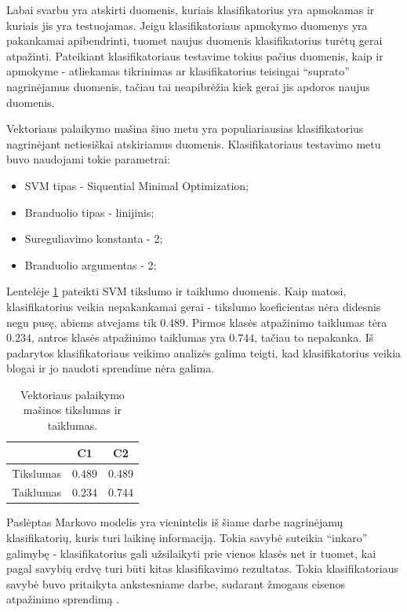 \documentclass[]{vgtuef}
\begin{document}
Labai svarbu yra atskirti duomenis, kuriais klasifikatorius yra
apmokamas ir kuriais jis yra testuojamas. Jeigu klasifikatoriaus
apmokymo duomenys yra pakankamai apibendrinti, tuomet naujus duomenis
klasifikatorius turėtų gerai atpažinti. Pateikiant klasifikatoriaus
testavime tokius pačius duomenis, kaip ir apmokyme - atliekamas
tikrinimas ar klasifikatorius teisingai ``suprato'' nagrinėjamus
duomenis, tačiau tai neapibrėžia kiek gerai jis apdoros naujus duomenis.

Vektoriaus palaikymo mašina šiuo metu yra populiariausias
klasifikatorius nagrinėjant netiesiškai atskiriamus
duomenis. Klasifikatoriaus testavimo metu buvo naudojami tokie
parametrai:

\begin{itemize}
\item SVM tipas - Siquential Minimal Optimization;
\item Branduolio tipas - linijinis;
\item Sureguliavimo konstanta - 2;
\item Branduolio argumentas - 2;
\end{itemize}

Lentelėje \ref{table:svm_scores} pateikti SVM tikslumo ir
taiklumo duomenis. Kaip matosi, klasifikatorius veikia nepakankamai
gerai - tikslumo koeficientas nėra didesnis negu pusę, abiems atvejams
tik $0.489$. Pirmos klasės atpažinimo taiklumas tėra $0.234$, antros
klasės atpažinimo taiklumas yra $0.744$, tačiau to nepakanka. Iš
padarytos klasifikatoriaus veikimo analizės galima teigti, kad
klasifikatorius veikia blogai ir jo naudoti sprendime nėra galima.

\begin{table}[t]
  \centering
  \caption{Vektoriaus palaikymo mašinos tikslumas ir taiklumas.}
  \label{table:svm_scores}
  \begin{tabular}{|c|c|c|} \hline
    & C1 & C2 \\ \hline
    Tikslumas & 0.489 & 0.489 \\ \hline
    Taiklumas & 0.234 & 0.744 \\ \hline
  \end{tabular}
\end{table}

Paslėptas Markovo modelis yra vienintelis iš šiame darbe nagrinėjamų
klasifikatorių, kuris turi laikinę informaciją. Tokia savybė suteikia
``inkaro'' galimybę - klasifikatorius gali užsilaikyti prie vienos
klasės net ir tuomet, kai pagal savybių erdvę turi būti kitas
klasifikavimo rezultatas. Tokia klasifikatoriaus savybė buvo
pritaikyta ankstesniame darbe, sudarant žmogaus eisenos atpažinimo
sprendimą \cite{mano_darbas}.
\end{document}
